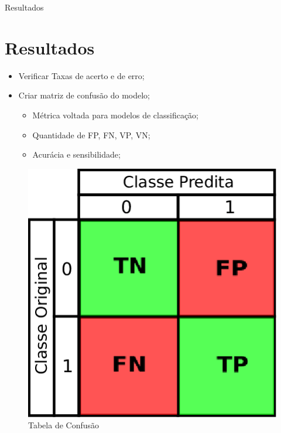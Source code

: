 \documentclass[compress]{beamer}
\begin{document}
\begin{frame}{Resultados}
\section{Resultados}
\begin{itemize}
    \item Verificar Taxas de acerto e de erro;
    \item Criar matriz de confusão do modelo;
    \begin{itemize}
        \item Métrica voltada para modelos de classificação;
        \item Quantidade de FP, FN, VP, VN;
        \item Acurácia e sensibilidade;
    \end{itemize}
\end{itemize}
\begin{figure}
    \centering
    \includegraphics[scale=.2]{img/confusion.png}
    \caption{Tabela de Confusão}
    \label{fig:confusion}
\end{figure}
\end{frame}
\end{document}
